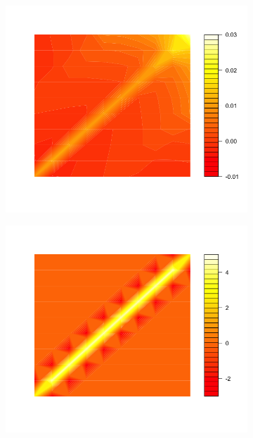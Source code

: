 \begin{figure}[H]
\begin{subfigure}[t]{0.19\textwidth}
\end{subfigure}
\hfill
  \begin{subfigure}[t]{.19\textwidth}
\centering
\includegraphics[width = \textwidth]{../img/chapter-4/true-covariance-3-heat-map}
\end{subfigure}
\hfill
  \begin{subfigure}[t]{0.19\textwidth}
\centering
\includegraphics[width = \textwidth]{../img/chapter-4/true-covariance-4-heat-map}

\end{subfigure}
\end{figure}
